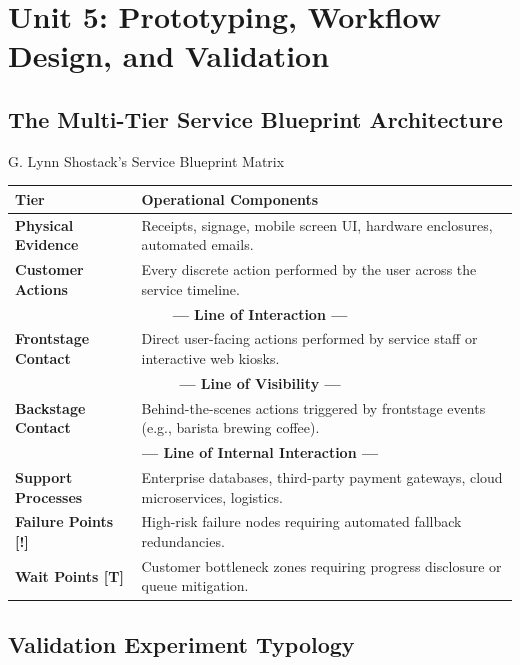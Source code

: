 \chapter{Unit 5: Prototyping, Workflow Design, and Validation}
\label{chap:unit5-prototyping-validation}

\section{The Multi-Tier Service Blueprint Architecture}

\begin{canvasbox}{G. Lynn Shostack's Service Blueprint Matrix}
\begin{tabularx}{\linewidth}{|l|X|} \hline
\textbf{Tier} & \textbf{Operational Components} \\ \hline
\textbf{Physical Evidence} & Receipts, signage, mobile screen UI, hardware enclosures, automated emails. \\ \hline
\textbf{Customer Actions} & Every discrete action performed by the user across the service timeline. \\ \hline
\multicolumn{2}{|c|}{\textbf{--- Line of Interaction ---}} \\ \hline
\textbf{Frontstage Contact} & Direct user-facing actions performed by service staff or interactive web kiosks. \\ \hline
\multicolumn{2}{|c|}{\textbf{--- Line of Visibility ---}} \\ \hline
\textbf{Backstage Contact} & Behind-the-scenes actions triggered by frontstage events (e.g., barista brewing coffee). \\ \hline
\multicolumn{2}{|c|}{\textbf{--- Line of Internal Interaction ---}} \\ \hline
\textbf{Support Processes} & Enterprise databases, third-party payment gateways, cloud microservices, logistics. \\ \hline
\textbf{Failure Points [!]} & High-risk failure nodes requiring automated fallback redundancies. \\ \hline
\textbf{Wait Points [T]} & Customer bottleneck zones requiring progress disclosure or queue mitigation. \\ \hline
\end{tabularx}
\end{canvasbox}

\section{Validation Experiment Typology}

